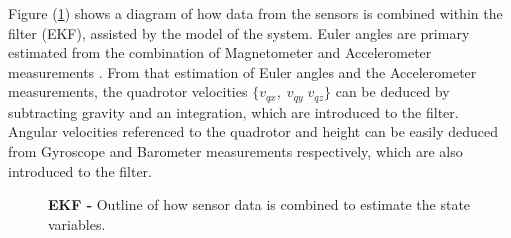 \documentclass[conference]{IEEEtran}
\newcommand{\refp}[1]{(\ref{#1})}
\begin{document}
Figure \refp{fig:diagrama_kalman} shows a diagram of how data from the sensors is combined within the filter (EKF), assisted by the model of the system. Euler angles are primary estimated from the combination of Magnetometer and Accelerometer measurements \cite{bib:kalman}. From that estimation of Euler angles and the Accelerometer measurements, the quadrotor velocities $\{v_{qx},\;v_{qy}\;v_{qz}\}$ can be deduced by subtracting gravity and an integration, which are introduced to the filter. Angular velocities referenced to the quadrotor and height can be easily deduced from Gyroscope and Barometer measurements respectively, which are also introduced to the filter.

\begin{figure}
  \centering
  \caption{\textbf{EKF - } Outline of how sensor data is combined to estimate the state variables.}
  \label{fig:diagrama_kalman}
  \vspace{-0.4cm}
\end{figure}


% 
\end{document}

